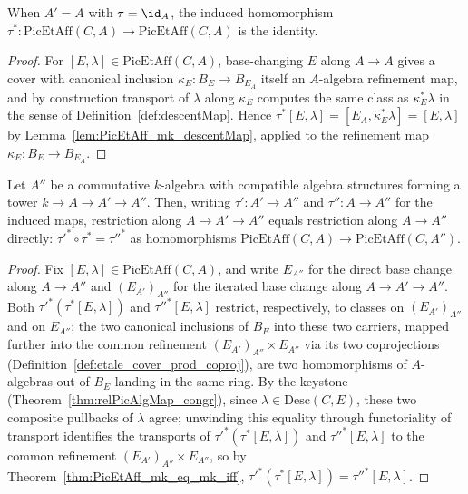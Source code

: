 \begin{theorem}
  \label{thm:PicEtAff_map_id}
  \leanok
  When \(A' = A\) with \(\tau = \id_A\), the induced homomorphism \(\tau^{*} \colon
  \mathrm{PicEtAff}(C,A) \to \mathrm{PicEtAff}(C,A)\) is the identity.
\end{theorem}
\begin{proof}
  \leanok
  For \([E,\lambda] \in \mathrm{PicEtAff}(C,A)\), base-changing \(E\) along \(A \to A\) gives a
  cover with canonical inclusion \(\kappa_E \colon B_E \to B_{E_A}\) itself an \(A\)-algebra
  refinement map, and by construction transport of \(\lambda\) along \(\kappa_E\) computes the
  same class as \(\kappa_E^{*}\lambda\) in the sense of Definition~\ref{def:descentMap}. Hence
  \(\tau^{*}[E,\lambda] = [E_A, \kappa_E^{*}\lambda] = [E,\lambda]\) by
  Lemma~\ref{lem:PicEtAff_mk_descentMap}, applied to the refinement map \(\kappa_E \colon B_E
  \to B_{E_A}\).
\end{proof}

\begin{theorem}
  \label{thm:PicEtAff_map_map}
  \leanok
  Let \(A''\) be a commutative \(k\)-algebra with compatible algebra structures forming a tower
  \(k \to A \to A' \to A''\). Then, writing \(\tau' \colon A' \to A''\) and \(\tau'' \colon A
  \to A''\) for the induced maps, restriction along \(A \to A' \to A''\) equals restriction
  along \(A \to A''\) directly:
  \(\tau'^{*} \circ \tau^{*} = \tau''^{*}\) as homomorphisms \(\mathrm{PicEtAff}(C,A) \to
  \mathrm{PicEtAff}(C,A'')\).
\end{theorem}
\begin{proof}
  \leanok
  Fix \([E,\lambda] \in \mathrm{PicEtAff}(C,A)\), and write \(E_{A''}\) for the direct base
  change along \(A \to A''\) and \((E_{A'})_{A''}\) for the iterated base change along
  \(A \to A' \to A''\). Both \(\tau'^{*}(\tau^{*}[E,\lambda])\) and \(\tau''^{*}[E,\lambda]\)
  restrict, respectively, to classes on \((E_{A'})_{A''}\) and on \(E_{A''}\); the two
  canonical inclusions of \(B_E\) into these two carriers, mapped further into the common
  refinement \((E_{A'})_{A''} \times E_{A''}\) via its two coprojections
  (Definition~\ref{def:etale_cover_prod_coproj}), are two homomorphisms of \(A\)-algebras out
  of \(B_E\) landing in the same ring. By the keystone (Theorem~\ref{thm:relPicAlgMap_congr}),
  since \(\lambda \in \mathrm{Desc}(C,E)\), these two composite pullbacks of \(\lambda\) agree;
  unwinding this equality through functoriality of transport identifies the transports of
  \(\tau'^{*}(\tau^{*}[E,\lambda])\) and \(\tau''^{*}[E,\lambda]\) to the common refinement
  \((E_{A'})_{A''} \times E_{A''}\), so by Theorem~\ref{thm:PicEtAff_mk_eq_mk_iff},
  \(\tau'^{*}(\tau^{*}[E,\lambda]) = \tau''^{*}[E,\lambda]\).
\end{proof}

